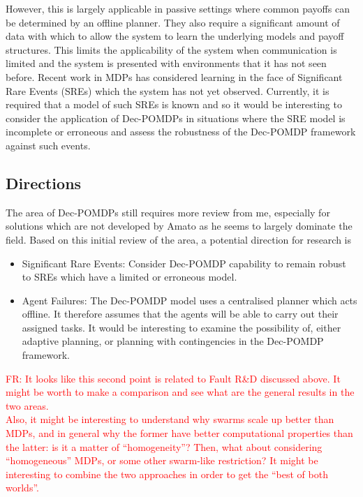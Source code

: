 \documentclass[preprint,11pt]{report}
\newcommand\fr[1]{\textcolor{red}{FR: #1}}
\begin{document}
However, this is largely applicable in passive settings where common
payoffs can be determined by an offline planner. They also require a
significant amount of data with which to allow the system to learn the
underlying models and payoff structures. This limits the applicability
of the system when communication is limited and the system is
presented with environments that it has not seen before.  Recent work
in MDPs \cite{Klima2019RobustDomains} has considered learning in the
face of Significant Rare Events (SREs) which the system has not yet
observed. Currently, it is required that a model of such SREs is known
and so it would be interesting to consider the application of
Dec-POMDPs in situations where the SRE model is incomplete or
erroneous and assess the robustness of the Dec-POMDP framework against
such events.

\subsection{Directions}

The area of Dec-POMDPs still requires more review from me, especially for solutions which are not
developed by Amato as he seems to largely dominate the field. Based on this initial review of the
area, a potential direction for research is

\begin{itemize} \item Significant Rare Events: Consider Dec-POMDP capability to remain robust to
  SREs which have a limited or erroneous model.


\item Agent Failures: The Dec-POMDP model uses a
centralised planner which acts offline. It therefore assumes that the agents will be able to carry
out their assigned tasks. It would be interesting to examine the possibility of, either adaptive
planning, or planning with contingencies in the Dec-POMDP framework. \end{itemize}

\fr{It looks like this second point is related to Fault R\&D discussed above. It might be worth to make a comparison and see what are the general results in the two areas.\\
Also, it might be interesting to understand why swarms scale up better
than MDPs, and in general why the former have better computational
properties than the latter: is it a matter of
``homogeneity''? Then, what about considering ``homogeneous'' MDPs, or
some other swarm-like restriction? It might be interesting to combine
the two approaches in order to get the ``best of both worlds''.}
\end{document}
